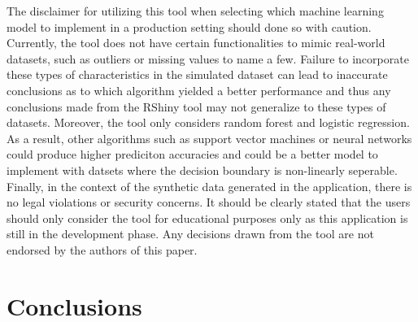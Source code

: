\documentclass{llncs}
\begin{document}
The disclaimer for utilizing this tool when selecting which machine learning model to implement in a production setting should done so with caution. Currently, the tool does not have certain functionalities to mimic real-world datasets, such as outliers or missing values to name a few. Failure to incorporate these types of characteristics in the simulated dataset can lead to inaccurate conclusions as to which algorithm yielded a better performance and thus any conclusions made from the RShiny tool may not generalize to these types of datasets. Moreover, the tool only considers random forest and logistic regression. As a result, other algorithms such as support vector machines or neural networks could produce higher prediciton accuracies and could be a better model to implement with datsets where the decision boundary is non-linearly seperable. Finally, in the context of the synthetic data generated in the application, there is no legal violations or security concerns. It should be clearly stated that the users should only consider the tool for educational purposes only as this application is still in the development phase. Any decisions drawn from the tool are not endorsed by the authors of this paper.


\section{Conclusions}
\end{document}
